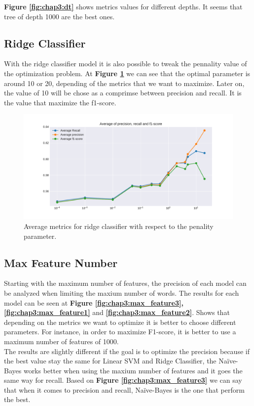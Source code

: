 \textbf{Figure \ref{fig:chap3:dt}} shows metrics values for different depths. It seems that tree of depth 1000 are the best ones.
\subsection{Ridge Classifier}
With the ridge classifier model it is also possible to tweak the pennality value of the optimization problem. At \textbf{Figure \ref{fig:chap3:ridge1}} we can see that the optimal parameter is around 10 or 20, depending of the metrics that we want to maximize. Later on, the value of 10 will be chose as a comprimse between precision and recall. It is the value that maximize the f1-score. 

\begin{figure}
	\centering
	\includegraphics[width=1\textwidth]{images/chapitre3/liar-ridge}
	\caption{Average metrics for ridge classifier with respect to the penality parameter.}
	\label{fig:chap3:ridge1}
\end{figure} 
\subsection{Max Feature Number}

Starting with the maximum number of features, the precision of each model can be analyzed when limiting the maxium number of words. The results for each model can be seen at \textbf{Figure \ref{fig:chap3:max_feature3}, \ref{fig:chap3:max_feature1}} and \textbf{\ref{fig:chap3:max_feature2}}. Shows that depending on the metrics we want to optimize it is better to choose different parameters. For instance, in order to maximize F1-score, it is better to use a maximum number of features of 1000.\\

The results are slightly different if the goal is to optimize the precision because if the best value stay the same for Linear SVM and Ridge Classifier, the Na\"{i}ve-Bayes works better when using the maxium number of features and it goes the same way for recall. 
Based on \textbf{Figure \ref{fig:chap3:max_feature3}} we can say that when it comes to precision and recall, Na\"{i}ve-Bayes is the one that perform the best.\\

